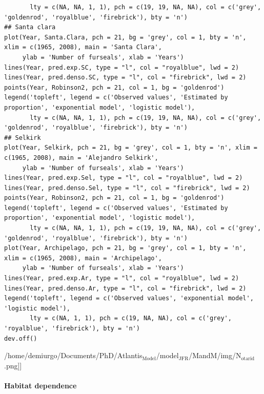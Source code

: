 \documentclass[11pt]{article}
\begin{document}
\begin{itemize}
\begin{itemize}
\begin{verbatim}
       lty = c(NA, NA, 1, 1), pch = c(19, 19, NA, NA), col = c('grey', 'goldenrod', 'royalblue', 'firebrick'), bty = 'n')
## Santa clara
plot(Year, Santa.Clara, pch = 21, bg = 'grey', col = 1, bty = 'n', xlim = c(1965, 2008), main = 'Santa Clara',
     ylab = 'Number of furseals', xlab = 'Years')
lines(Year, pred.exp.SC, type = "l", col = "royalblue", lwd = 2)
lines(Year, pred.denso.SC, type = "l", col = "firebrick", lwd = 2)
points(Year, Robinson2, pch = 21, col = 1, bg = 'goldenrod')
legend('topleft', legend = c('Observed values', 'Estimated by proportion', 'exponential model', 'logistic model'),
       lty = c(NA, NA, 1, 1), pch = c(19, 19, NA, NA), col = c('grey', 'goldenrod', 'royalblue', 'firebrick'), bty = 'n')
## Selkirk
plot(Year, Selkirk, pch = 21, bg = 'grey', col = 1, bty = 'n', xlim = c(1965, 2008), main = 'Alejandro Selkirk',
     ylab = 'Number of furseals', xlab = 'Years')
lines(Year, pred.exp.Sel, type = "l", col = "royalblue", lwd = 2)
lines(Year, pred.denso.Sel, type = "l", col = "firebrick", lwd = 2)
points(Year, Robinson2, pch = 21, col = 1, bg = 'goldenrod')
legend('topleft', legend = c('Observed values', 'Estimated by proportion', 'exponential model', 'logistic model'),
       lty = c(NA, NA, 1, 1), pch = c(19, 19, NA, NA), col = c('grey', 'goldenrod', 'royalblue', 'firebrick'), bty = 'n')
plot(Year, Archipelago, pch = 21, bg = 'grey', col = 1, bty = 'n', xlim = c(1965, 2008), main = 'Archipelago',
     ylab = 'Number of furseals', xlab = 'Years')
lines(Year, pred.exp.Ar, type = "l", col = "royalblue", lwd = 2)
lines(Year, pred.denso.Ar, type = "l", col = "firebrick", lwd = 2)
legend('topleft', legend = c('Observed values', 'exponential model', 'logistic model'),
       lty = c(NA, 1, 1), pch = c(19, NA, NA), col = c('grey', 'royalblue', 'firebrick'), bty = 'n')
dev.off()
\end{verbatim}
       /home/demiurgo/Documents/PhD/Atlantis$_{\mathrm{Model}}$/model$_{\mathrm{JFR}}$/MandM/img/N$_{\mathrm{otarid}}$.png]]
\end{itemize} %
\end{itemize} %
\paragraph*{Habitat dependence}
\label{sec-5-2-1-2}
\end{document}
